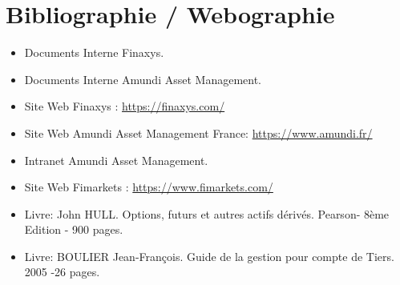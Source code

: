 \chapter*{Bibliographie / Webographie}
\begin{itemize}
     \item Documents Interne Finaxys. \\
     \item Documents Interne Amundi Asset Management. \\
     \item Site Web Finaxys : \url{https://finaxys.com/} \\
     \item Site Web Amundi Asset Management France: \url{https://www.amundi.fr/} \\
     \item Intranet Amundi Asset Management. \\
     \item Site Web Fimarkets : \url{https://www.fimarkets.com/} \\
     \item Livre: John HULL. Options, futurs et autres actifs dérivés. Pearson- 8ème Edition - 900 pages. \\
     \item Livre: BOULIER Jean-François. Guide de la gestion pour compte de Tiers. 2005 -26 pages.
\end{itemize}